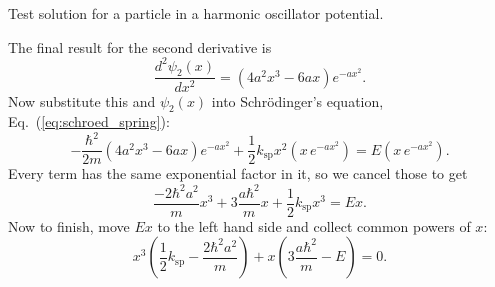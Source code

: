 \begin{example}{Test solution for a particle in a harmonic oscillator potential.}
\begin{solution}
The final result for the second derivative is
\begin{equation}
\label{eq:2ndDerivative}
\frac{d^2 \psi_2(x)}{dx^2} = \left(4 a^2 x^3 - 6 a x \right) e^{- a x^2}.
\end{equation}
Now substitute this and $\psi_2(x)$ into Schr\"odinger's equation,
Eq.~(\ref{eq:schroed_spring}):
\begin{equation}
-\frac{\hbar^2}{2m}\left(4a^2x^3 - 6ax\right) e^{-ax^2}
+\frac{1}{2}k_\text{sp}x^2\left(x \,e^{-ax^2}\right) = E\left(x \,e^{-ax^2}\right) .
\end{equation}
Every term has the same exponential factor in it, so we cancel those
to get
\begin{equation}
\frac{-2\hbar^2a^2}{m}x^3 + 3\frac{a\hbar^2}{m}x + \frac{1}{2}k_\text{sp}x^3
= Ex .
\end{equation}
Now to finish, move $Ex$ to the left hand side and collect common
powers of $x$:
\begin{equation}
x^3\left(\frac{1}{2}k_\text{sp} - \frac{2\hbar^2a^2}{m}\right)
+ x\left(3\frac{a\hbar^2}{m} - E\right) = 0.
\end{equation}


\end{solution}
\end{example}
